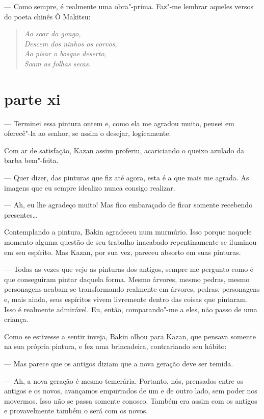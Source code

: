 --- Como sempre, é realmente uma obra"-prima. Faz"-me lembrar aqueles versos
do poeta chinês Ô Makitsu:

\pagebreak

\begin{verse}
\textit{Ao soar do gongo,\\
Descem dos ninhos os corvos,\\
Ao pisar o bosque deserto,\\
Soam as folhas secas.}
\end{verse}

\section*{parte xi}

--- Terminei essa pintura ontem e, como ela me agradou muito, pensei em
oferecê"-la ao senhor, se assim o desejar, logicamente.

Com ar de satisfação, Kazan assim proferiu, acariciando o queixo azulado
da barba bem"-feita.

--- Quer dizer, das pinturas que fiz até agora, esta é a que mais me
agrada. As imagens que eu sempre idealizo nunca consigo realizar.

--- Ah, eu lhe agradeço muito! Mas fico embaraçado de ficar somente
recebendo presentes\ldots{}

Contemplando a pintura, Bakin agradeceu num murmúrio. Isso porque
naquele momento alguma questão de seu trabalho inacabado repentinamente
se iluminou em seu espírito. Mas Kazan, por sua vez, pareceu absorto em
suas pinturas.

--- Todas as vezes que vejo as pinturas dos antigos, sempre me pergunto
como é que conseguiram pintar daquela forma. Mesmo árvores, mesmo
pedras, mesmo personagens acabam se transformando realmente em árvores,
pedras, personagens e, mais ainda, seus espíritos vivem livremente
dentro das coisas que pintaram. Isso é realmente admirável. Eu, então,
comparando"-me a eles, não passo de uma criança.

Como se estivesse a sentir inveja, Bakin olhou para Kazan, que pensava
somente na sua própria pintura, e fez uma brincadeira, contrariando seu
hábito:

--- Mas parece que os antigos diziam que a nova geração deve ser temida.

--- Ah, a nova geração é mesmo temerária. Portanto, nós, prensados entre
os antigos e os novos, avançamos empurrados de um e de outro lado, sem
poder nos movermos. Isso não se passa somente conosco. Também era assim
com os antigos e provavelmente também o será com os novos.

